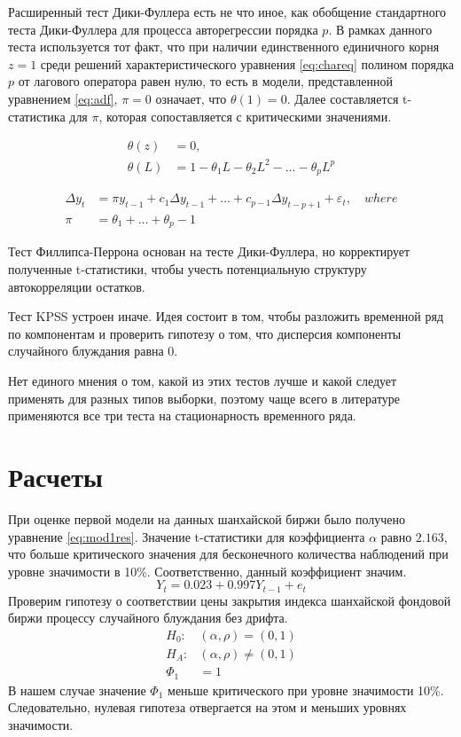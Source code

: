 \documentclass[a4paper,12pt]{article}
\begin{document}
Расширенный тест Дики-Фуллера есть не что иное, как обобщение стандартного теста Дики-Фуллера для процесса авторегрессии порядка $p$. В рамках данного теста используется тот факт, что при наличии единственного единичного корня $z=1$ среди решений характеристического уравнения \ref{eq:chareq} полином порядка $p$ от лагового оператора равен нулю, то есть в модели, представленной уравнением \ref{eq:adf}, $\pi=0$ означает, что $\theta(1)=0$. Далее составляется t-статистика для $\pi$, которая сопоставляется с критическими значениями.

\begin{align}
  \label{eq:chareq}
  \theta(z)&=0,\\
  \theta(L)&=1-\theta_1 L-\theta_2 L^2-\ldots-\theta_p L^p
\end{align}

\begin{align}
  \label{eq:adf}
  \Delta y_t&=\pi y_{t-1}+c_1\Delta y_{t-1}+\ldots+c_{p-1}\Delta y_{t-p+1}+\varepsilon_t,\quad where\\
  \pi&=\theta_1+\ldots+\theta_p-1
\end{align}

Тест Филлипса-Перрона основан на тесте Дики-Фуллера, но корректирует полученные t-статистики, чтобы учесть потенциальную структуру автокорреляции остатков.

Тест KPSS устроен иначе. Идея состоит в том, чтобы разложить временной ряд по компонентам и проверить гипотезу о том, что дисперсия компоненты случайного блуждания равна 0.

Нет единого мнения о том, какой из этих тестов лучше и какой следует применять для разных типов выборки, поэтому чаще всего в литературе применяются все три теста на стационарность временного ряда.

\newpage
\section{Расчеты}\label{sec:quant}
При оценке первой модели на данных шанхайской биржи было получено уравнение \ref{eq:mod1res}. Значение t-статистики для коэффициента $\alpha$ равно $2.163$, что больше критического значения для бесконечного количества наблюдений при уровне значимости в 10\%. Соответственно, данный коэффициент значим.
  \begin{equation}
    \label{eq:mod1res}
    Y_t=0.023+0.997Y_{t-1}+e_t
  \end{equation}
Проверим гипотезу о соответствии цены закрытия индекса шанхайской фондовой биржи процессу случайного блуждания без дрифта.
\begin{align}
  H_0:&(\alpha,\rho)=(0,1)\\
  H_A:&(\alpha,\rho)\neq(0,1)\\
  \Phi_1&=1
\end{align}
В нашем случае значение $\Phi_1$ меньше критического при уровне значимости 10\%. Следовательно, нулевая гипотеза отвергается на этом и меньших уровнях значимости.
\end{document}
